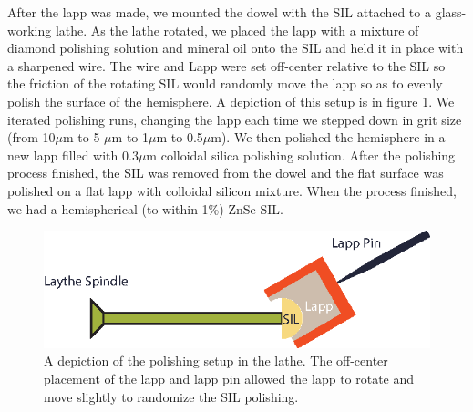 \indent After the lapp was made, we mounted the dowel with the SIL attached to a glass-working lathe. As the lathe rotated, we placed the lapp with a mixture of diamond polishing solution and mineral oil onto the SIL and held it in place with a sharpened wire. The wire and Lapp were set off-center relative to the SIL so the friction of the rotating SIL would randomly move the lapp so as to evenly polish the surface of the hemisphere. A depiction of this setup is in figure \ref{polish}. We iterated polishing runs, changing the lapp each time we stepped down in grit size (from 10$\mu$m to 5 $\mu$m to 1$\mu$m to 0.5$\mu$m). We then polished the hemisphere in a new lapp filled with 0.3$\mu$m colloidal silica polishing solution. After the polishing process finished, the SIL was removed from the dowel and the flat surface was polished on a flat lapp with colloidal silicon mixture. When the process finished, we had a hemispherical (to within 1\%) ZnSe SIL.

\begin{figure}[h!]
\centering
\includegraphics[width = .8\textwidth]{lathe.eps}
\caption{ \doublespacing A depiction of the polishing setup in the lathe. The off-center placement of the lapp and lapp pin allowed the lapp to rotate and move slightly to randomize the SIL polishing.}
\label{polish}
\end{figure}

